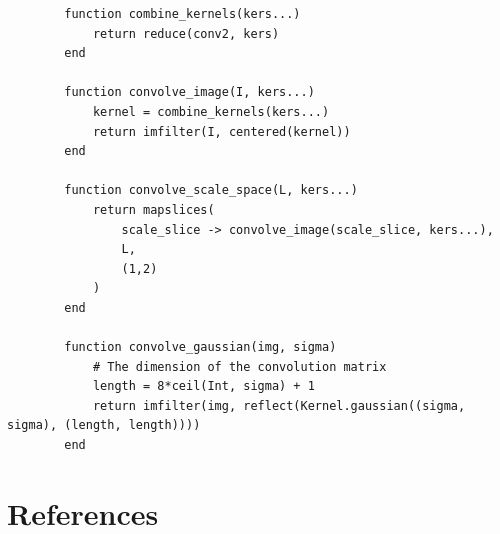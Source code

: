 \documentclass{article}
\begin{document}
    \begin{lstlisting}
        function combine_kernels(kers...)
            return reduce(conv2, kers)
        end

        function convolve_image(I, kers...)
            kernel = combine_kernels(kers...)
            return imfilter(I, centered(kernel))
        end

        function convolve_scale_space(L, kers...)
            return mapslices(
                scale_slice -> convolve_image(scale_slice, kers...),
                L,
                (1,2)
            )
        end

        function convolve_gaussian(img, sigma)
            # The dimension of the convolution matrix
            length = 8*ceil(Int, sigma) + 1
            return imfilter(img, reflect(Kernel.gaussian((sigma, sigma), (length, length))))
        end
    \end{lstlisting}

\section*{References}
\end{document}

